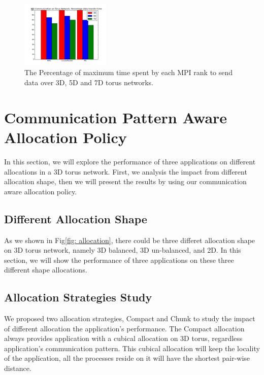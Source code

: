 \documentclass[conference]{IEEEtran}
\begin{document}
\begin{figure}[h!] 
  \centering
  \includegraphics[width=0.38\textwidth]{figs/torusdimen}
   \caption{The Percentage of maximum time spent by each MPI rank to send data over 3D, 5D and 7D torus networks. }
   \label{fig: torus dimen study}
\end{figure}



\section{Communication Pattern Aware Allocation Policy }
In this section, we will explore the performance of three applications on different allocations in a 3D torus network. First, we analysis the impact from different allocation shape, then we will present the results by using our communication aware allocation policy.  

\subsection{Different Allocation Shape}
As we shown in Fig\ref{fig: allocation}, there could be three differet allocation shape on 3D torus network, namely 3D balanced, 3D un-balanced, and 2D. In this section, we will show the performance of three applications on these three different shape allocations.




\subsection{Allocation Strategies Study}
\label{sec: alloc strategy study}

We proposed two allocation strategies, Compact and Chunk to study the impact of different allocation the application's performance. The Compact allocation always provides application with a cubical allocation on 3D torus, regardless application's communication pattern. This cubical allocation will keep the locality of the application, all the processes reside on it will have the shortest pair-wise distance. 
\end{document}
